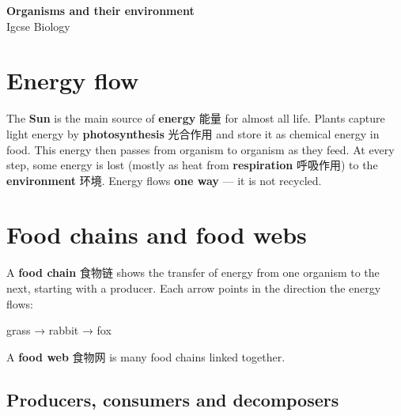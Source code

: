 \documentclass[11pt]{article}
\begin{document}
\begin{center}
  {\LARGE\bfseries Organisms and their environment}\\[0.35em]
  {\large Igcse Biology}
\end{center}
\vspace{0.6em}

\section*{Energy flow}

The \textbf{Sun} is the main source of \textbf{energy} 能量 for almost all life. Plants capture light energy by \textbf{photosynthesis} 光合作用 and store it as chemical energy in food. This energy then passes from organism to organism as they feed. At every step, some energy is lost (mostly as heat from \textbf{respiration} 呼吸作用) to the \textbf{environment} 环境. Energy flows \textbf{one way} — it is not recycled.

\section*{Food chains and food webs}

A \textbf{food chain} 食物链 shows the transfer of energy from one organism to the next, starting with a producer. Each arrow points in the direction the energy flows:

grass → rabbit → fox

A \textbf{food web} 食物网 is many food chains linked together.

\subsection*{Producers, consumers and decomposers}

\begin{center}
\end{center}
\end{document}
